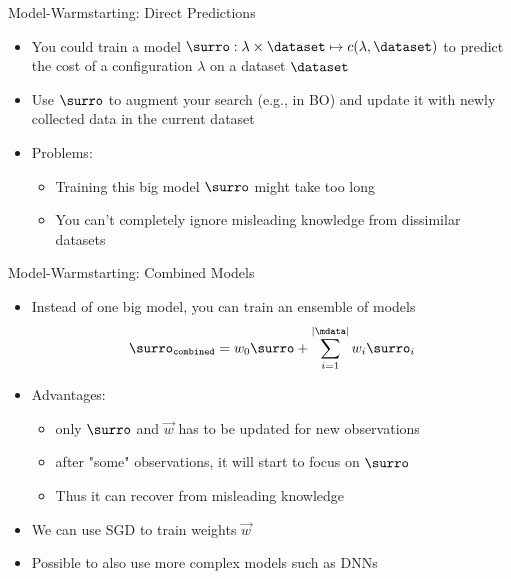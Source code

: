 \begin{frame}[c]{Model-Warmstarting: Direct Predictions}

\begin{itemize}
	\item You could train a model $\surro: \lambda \times \dataset \mapsto c(\lambda, \dataset)$ to predict the cost of a configuration $\lambda$ on a dataset $\dataset$ 
	\item Use $\surro$ to augment your search (e.g., in BO) and update it with newly collected data in the current dataset
	\item Problems:
	\begin{itemize}
		\item Training this big model $\surro$ might take too long
		\item You can't completely ignore misleading knowledge from dissimilar datasets
	\end{itemize}
\end{itemize}


\end{frame}
\begin{frame}[c]{Model-Warmstarting: Combined Models}

\begin{itemize}
	\item Instead of one big model, you can train an ensemble of models
	$$ \surro_{\texttt{combined}} = w_0 \surro + \sum_{i=1}^{|\mdata|} w_i \surro_i$$
	\pause
	\item Advantages:
	\begin{itemize}
		\item only $\surro$ and $\vec{w}$ has to be updated for new observations
		\item after "some" observations, it will start to focus on $\surro$ 
		\item Thus it can recover from misleading knowledge
	\end{itemize}
	\medskip
	\pause
	\item We can use SGD to train weights $\vec{w}$
	\pause
	\item Possible to also use more complex models such as DNNs
\end{itemize}


\end{frame}
